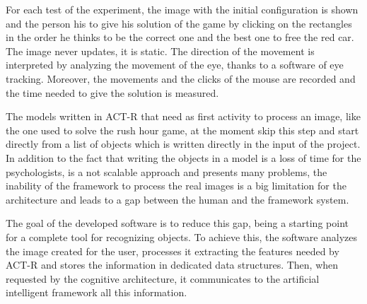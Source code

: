 	For each test of the experiment, the image with the initial configuration is shown and the person his to give his solution of the game by clicking on the rectangles in the order he thinks to be the correct one and the best one to free the red car. The image never updates, it is static. The direction of the movement is interpreted by analyzing the movement of the eye, thanks to a software of eye tracking. Moreover, the movements and the clicks of the mouse are recorded and the time needed to give the solution is measured. 

	The models written in ACT-R that need as first activity to process an image, like the one used to solve the rush hour game, at the moment skip this step and start directly from a list of objects which is written directly in the input of the project. 
	In addition to the fact that writing the objects in a model is a loss of time for the psychologists, is a not scalable approach and presents many problems, the inability of the framework to process the real images is a big limitation for the architecture and leads to a gap between the human and the framework system.
	
	The goal of the developed software is to reduce this gap, being a starting point for a complete  tool for recognizing objects. To achieve this, the software analyzes the image created for the user, processes it extracting the features needed by ACT-R and stores the information in dedicated data structures. Then, when requested by the cognitive architecture, it communicates to the artificial intelligent framework all this information.

